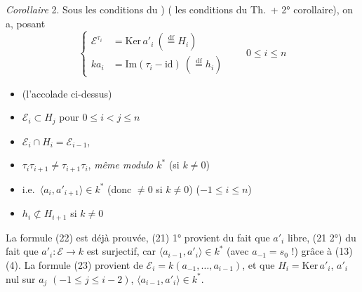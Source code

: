\documentclass[11pt,a4paper]{article}
\begin{document}
\emph{Corollaire} 2. Sous les conditions du \struck{\ill{}}) ( les conditions du Th.\ + 2° corollaire), \struck{\ill{}} on a, posant
\[
\left\lbrace
\begin{aligned}
\mathcal{E}^{\tau_i} &= \mathrm{Ker}\, a'_i \ (\overset{\mathrm{df}}{=} H_i) \\
k a_i &= \mathrm{Im}(\tau_i - \mathrm{id}) \ (\overset{\mathrm{df}}{=} h_i)
\end{aligned}
\right.
\qquad 0 \leq i \leq n
\]
\begin{itemize}
\item[(21)] (l'accolade ci-dessus)
\item[(22)] $\mathcal{E}_i \subset H_j$  pour $0 \leq i < j \leq n$
\item[(23)] $\mathcal{E}_i \cap H_i = \mathcal{E}_{i-1}$,
\item[(24)] $\tau_i \tau_{i+1} \neq \tau_{i+1} \tau_i$, \emph{même modulo $k^*$} (si $k \neq 0$)
\item[(25)]  i.e.\ $\langle a_i, a'_{i+1} \rangle \in k^*$ (donc $\neq 0$ si $k \neq 0$) ($-1 \leq i \leq n$)
\item[(25')] $h_i \not\subset H_{i+1}$ si $k \neq 0$
\end{itemize}

La formule (22) est déjà prouvée, (21) 1° provient du fait que $a'_i$  libre, (21 2°) du fait que $a'_i : \mathcal{E} \to k$ est surjectif, car $\langle a_{i-1}, a'_i \rangle \in k^*$ (avec $a_{-1} = s_0$ !) grâce à (13) (4).  La formule (23) provient de $\mathcal{E}_i = k(a_{-1}, \dots, a_{i-1})$, et que $H_i = \mathrm{Ker}\, a'_i$, $a'_i$ nul sur $a_j$ $(-1 \leq j \leq i-2)$, $\langle a_{i-1}, a'_i \rangle \in k^*$.
\end{document}
